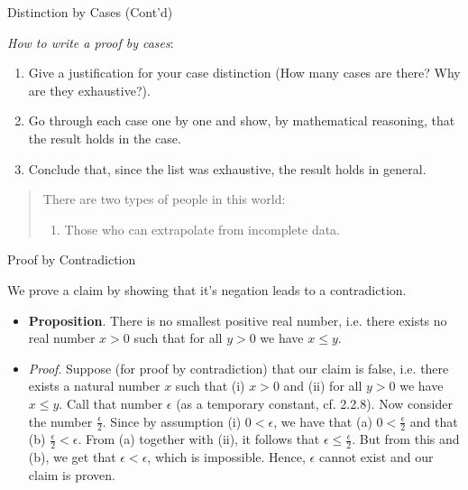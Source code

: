 \documentclass[../slides.tex]{subfiles}
\begin{document}
\begin{frame}{Distinction by Cases (Cont'd)}

	 \emph{How to write a proof by cases}:
			
				\begin{enumerate}[1.]
				
					\item Give a justification for your case distinction (How many cases are there? Why are they exhaustive?).
					
					\item Go through each case one by one and show, by mathematical reasoning, that the result holds in the case.
					
					\item Conclude that, since the list was exhaustive, the result holds in general.
				
				\end{enumerate}
				
		
		\begin{quote}
		There are two types of people in this world:
		
		\begin{enumerate}[1)]
		
			\item Those who can extrapolate from incomplete data.
		
		\end{enumerate}
		\begin{flushright}
		\end{flushright}
		
		\end{quote}

\end{frame}

\begin{frame}{Proof by Contradiction}

We prove a claim by showing that it's negation leads to a contradiction.

\begin{itemize}

\item \textbf{Proposition}. 				There is no smallest positive real number, i.e. there exists no real number $x>0$ such that for all $y>0$ we have $x\leq y$.  

\item \emph{Proof}. 				Suppose (for proof by contradiction) that our claim is false, i.e. there exists a natural number $x$ such that (i) $x>0$ and (ii) for all $y>0$ we have $x\leq y$. Call that number $\epsilon$ (as a temporary constant, cf. 2.2.8). Now consider the number $\frac{\epsilon}{2}$. Since by assumption (i) $0<\epsilon$, we have that (a) $0<\frac{\epsilon}{2}$ and that (b) $\frac{\epsilon}{2}<\epsilon$. From (a) together with (ii), it follows that $\epsilon\leq \frac{\epsilon}{2}$. But from this and (b), we get that $\epsilon<\epsilon$, which is impossible. Hence, $\epsilon$ cannot exist and our claim is proven. 

\end{itemize}

\end{frame}
\end{document}
